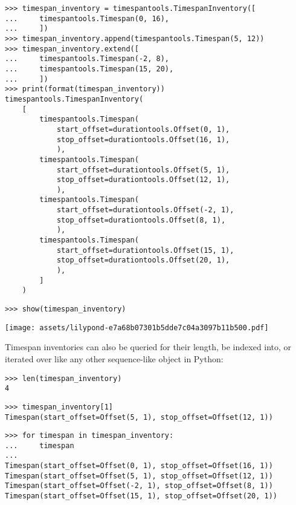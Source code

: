 \begin{abjadbookoutput}
\begin{singlespacing}
\vspace{-0.5\baselineskip}
\begin{lstlisting}
>>> timespan_inventory = timespantools.TimespanInventory([
...     timespantools.Timespan(0, 16),
...     ])
>>> timespan_inventory.append(timespantools.Timespan(5, 12))
>>> timespan_inventory.extend([
...     timespantools.Timespan(-2, 8),
...     timespantools.Timespan(15, 20),
...     ])
>>> print(format(timespan_inventory))
timespantools.TimespanInventory(
    [
        timespantools.Timespan(
            start_offset=durationtools.Offset(0, 1),
            stop_offset=durationtools.Offset(16, 1),
            ),
        timespantools.Timespan(
            start_offset=durationtools.Offset(5, 1),
            stop_offset=durationtools.Offset(12, 1),
            ),
        timespantools.Timespan(
            start_offset=durationtools.Offset(-2, 1),
            stop_offset=durationtools.Offset(8, 1),
            ),
        timespantools.Timespan(
            start_offset=durationtools.Offset(15, 1),
            stop_offset=durationtools.Offset(20, 1),
            ),
        ]
    )
\end{lstlisting}
\begin{lstlisting}
>>> show(timespan_inventory)
\end{lstlisting}
\noindent\texttt{[image: assets/lilypond-e7a68b07301b5dde7c04a3097b11b500.pdf]}
\end{singlespacing}
\end{abjadbookoutput}

\noindent Timespan inventories can also be queried for their length, be indexed
into, or iterated over like any other sequence-like object in Python:

\begin{comment}
<abjad>
len(timespan_inventory)
timespan_inventory[1]
for timespan in timespan_inventory:
    timespan

</abjad>
\end{comment}

\begin{abjadbookoutput}
\begin{singlespacing}
\vspace{-0.5\baselineskip}
\begin{lstlisting}
>>> len(timespan_inventory)
4
\end{lstlisting}
\begin{lstlisting}
>>> timespan_inventory[1]
Timespan(start_offset=Offset(5, 1), stop_offset=Offset(12, 1))
\end{lstlisting}
\begin{lstlisting}
>>> for timespan in timespan_inventory:
...     timespan
...
Timespan(start_offset=Offset(0, 1), stop_offset=Offset(16, 1))
Timespan(start_offset=Offset(5, 1), stop_offset=Offset(12, 1))
Timespan(start_offset=Offset(-2, 1), stop_offset=Offset(8, 1))
Timespan(start_offset=Offset(15, 1), stop_offset=Offset(20, 1))
\end{lstlisting}
\end{singlespacing}
\end{abjadbookoutput}

